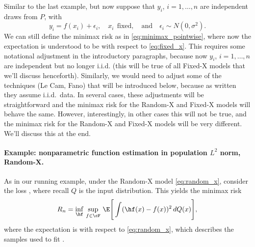 \documentclass{article}
\begin{document}
Similar to the last example, but now suppose that $y_i$, $i=1,\dots,n$ are
independent draws from $P$, with    
\begin{equation}
\label{eq:fixed_x}
y_i = f(x_i) + \epsilon_i, \quad x_i \;\, \text{fixed}, \quad \text{and} \quad
\epsilon_i \sim N(0,\sigma^2).
\end{equation}
We can still define the minimax risk as in \eqref{eq:minimax_pointwise}, where
now the expectation is understood to be with respect to \eqref{eq:fixed_x}. This 
requires some notational adjustment in the introductory paragraphs, because now
$y_i$, $i=1,\dots,n$ are independent but no longer i.i.d. (this will be true of
all Fixed-X models that we'll discuss henceforth). Similarly, we would need to  
adjust some of the techniques (Le Cam, Fano) that will be introduced below,
because as written they assume i.i.d.\ data. In several cases, these adjustments
will be straightforward and the minimax risk for the Random-X and Fixed-X models
will behave the same. However, interestingly, in other cases this will not be
true, and the minimax risk for the Random-X and Fixed-X models will be very
different. We'll discuss this at the end.

\paragraph{Example: nonparametric function estimation in population $L^2$ norm,
  Random-X.}  

As in our running example, under the Random-X model \eqref{eq:random_x},
consider the loss , where recall $Q$
is the input distribution. This yields the minimax risk     
\begin{equation}
\label{eq:minimax_population}
R_n = \inf_{\hf} \, \sup_{f \in \cF} \, \E\Bigg[ \int (\hf(x) - f(x))^2 \, dQ(x)
\Bigg],   
\end{equation}
where the expectation is with respect to \eqref{eq:random_x}, which describes
the samples used to fit \smash{$\hf$}.  


\end{document}
